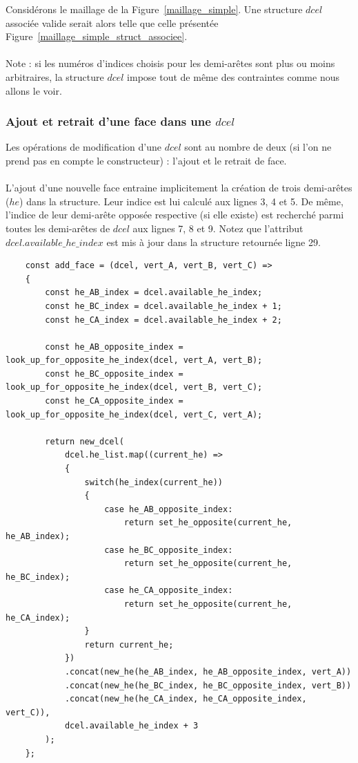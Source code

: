 \documentclass[]{article}
\begin{document}
	Considérons le maillage de la Figure~\ref{maillage_simple}. Une structure $dcel$ associée valide serait alors telle que celle présentée Figure~\ref{maillage_simple_struct_associee}.\\\\
	Note : si les numéros d'indices choisis pour les demi-arêtes sont plus ou moins arbitraires, la structure $dcel$ impose tout de même des contraintes comme nous allons le voir.
	
	
	\subsubsection{Ajout et retrait d'une face dans une $dcel$}
	Les opérations de modification d'une $dcel$ sont au nombre de deux (si l'on ne prend pas en compte le constructeur) : l'ajout et le retrait de face.\\\\
	L'ajout d'une nouvelle face entraine implicitement la création de trois demi-arêtes ($he$) dans la structure. Leur indice est lui calculé aux lignes 3, 4 et 5. De même, l'indice de leur demi-arête opposée respective (si elle existe) est recherché parmi toutes les demi-arêtes de $dcel$ aux lignes 7, 8 et 9.
	Notez que l'attribut $dcel.available\_he\_index$ est mis à jour dans la structure retournée ligne 29.
	\begin{lstlisting}
	const add_face = (dcel, vert_A, vert_B, vert_C) =>
	{
		const he_AB_index = dcel.available_he_index;
		const he_BC_index = dcel.available_he_index + 1;
		const he_CA_index = dcel.available_he_index + 2;
		
		const he_AB_opposite_index = look_up_for_opposite_he_index(dcel, vert_A, vert_B);
		const he_BC_opposite_index = look_up_for_opposite_he_index(dcel, vert_B, vert_C);
		const he_CA_opposite_index = look_up_for_opposite_he_index(dcel, vert_C, vert_A);
		
		return new_dcel(
			dcel.he_list.map((current_he) =>
			{
				switch(he_index(current_he))
				{
					case he_AB_opposite_index:
						return set_he_opposite(current_he, he_AB_index);
					case he_BC_opposite_index:
						return set_he_opposite(current_he, he_BC_index);
					case he_CA_opposite_index:
						return set_he_opposite(current_he, he_CA_index);
				}
				return current_he;
			})
			.concat(new_he(he_AB_index, he_AB_opposite_index, vert_A))
			.concat(new_he(he_BC_index, he_BC_opposite_index, vert_B))
			.concat(new_he(he_CA_index, he_CA_opposite_index, vert_C)),
			dcel.available_he_index + 3
		);
	};
	\end{lstlisting}
	
\end{document}
